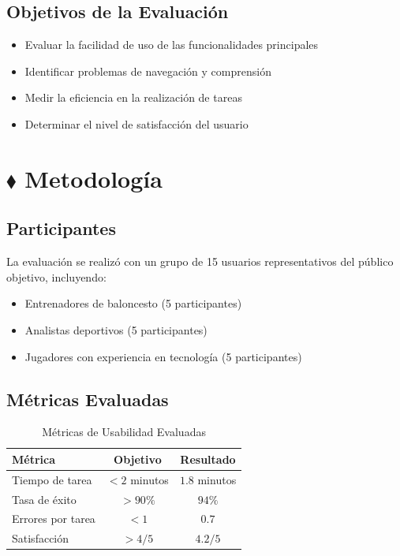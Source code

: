 \documentclass[12pt,a4paper]{article}
\begin{document}
\subsection{Objetivos de la Evaluación}

\begin{itemize}[leftmargin=1.5cm]
    \item[$\bullet$] Evaluar la facilidad de uso de las funcionalidades principales
    \item[$\bullet$] Identificar problemas de navegación y comprensión
    \item[$\bullet$] Medir la eficiencia en la realización de tareas
    \item[$\bullet$] Determinar el nivel de satisfacción del usuario
\end{itemize}

\section{$\blacklozenge$ Metodología}

\subsection{Participantes}

La evaluación se realizó con un grupo de 15 usuarios representativos del público objetivo, incluyendo:

\begin{itemize}
    \item Entrenadores de baloncesto (5 participantes)
    \item Analistas deportivos (5 participantes)
    \item Jugadores con experiencia en tecnología (5 participantes)
\end{itemize}

\subsection{Métricas Evaluadas}

\begin{table}[H]
\centering
\caption{Métricas de Usabilidad Evaluadas}
\begin{tabular}{@{}lcc@{}}
\toprule
\textbf{Métrica} & \textbf{Objetivo} & \textbf{Resultado} \\
\midrule
Tiempo de tarea & $< 2$ minutos & $1.8$ minutos \\
Tasa de éxito & $> 90\%$ & $94\%$ \\
Errores por tarea & $< 1$ & $0.7$ \\
Satisfacción & $> 4/5$ & $4.2/5$ \\
\bottomrule
\end{tabular}
\end{table}
\end{document}
